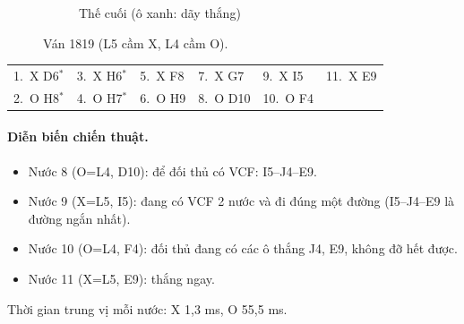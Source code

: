 \begin{figure}[H]
\begin{subfigure}[t]{.48\linewidth}
    \caption{Thế cuối (ô xanh: dãy thắng)}
  \end{subfigure}
  \caption{Ván 1819 (L5 cầm X, L4 cầm O).}
  \label{fig:cs-van-19}
\end{figure}
{\footnotesize\linespread{1}\selectfont
\noindent\begin{tabularx}{\linewidth}{*{6}{X}}
\toprule
1.~X D6$^\ast$ & 3.~X H6$^\ast$ & 5.~X F8 & 7.~X G7 & 9.~X I5 & 11.~X E9 \\
2.~O H8$^\ast$ & 4.~O H7$^\ast$ & 6.~O H9 & 8.~O D10 & 10.~O F4 &  \\
\bottomrule
\end{tabularx}\par}
\paragraph{Diễn biến chiến thuật.}
\begin{itemize}\footnotesize\linespread{1.1}\selectfont
\setlength{\itemsep}{0pt}
  \item Nước 8 (O=L4, D10): để đối thủ có VCF: I5--J4--E9.
  \item Nước 9 (X=L5, I5): đang có VCF 2 nước và đi đúng một đường (I5--J4--E9 là đường ngắn nhất).
  \item Nước 10 (O=L4, F4): đối thủ đang có các ô thắng J4, E9, không đỡ hết được.
  \item Nước 11 (X=L5, E9): thắng ngay.
\end{itemize}
Thời gian trung vị mỗi nước: X 1,3 ms, O 55,5 ms.
\clearpage

